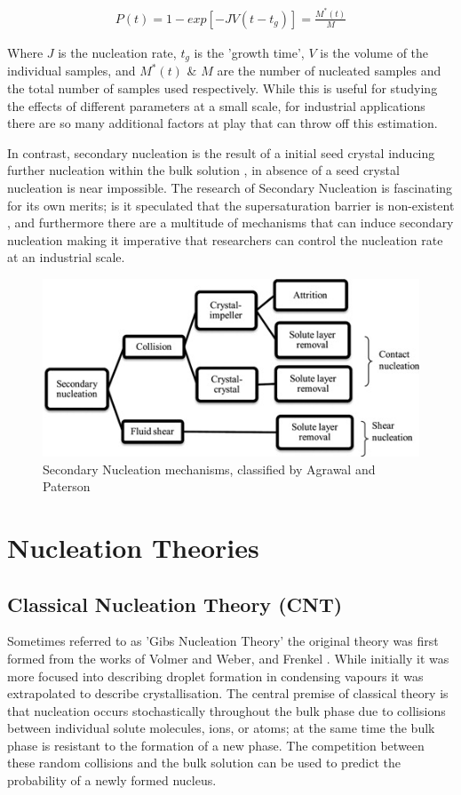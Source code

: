 \begin{align}
	P(t) = 1 - exp\left[-JV(t-t_g)\right] = \frac{M^*(t)}{M}
\end{align}

Where $J$ is the nucleation rate, $t_g$ is the 'growth time', $V$
is the volume of the individual samples, and $M^*(t)$ \& $M$ are the 
number of nucleated samples and the total number of samples used respectively.
While this is useful for studying the effects of different parameters
at a small scale, for industrial applications there are so many
additional factors at play that can throw off this estimation.

In contrast, secondary nucleation is the result of a initial 
seed crystal inducing further nucleation within the bulk solution
\cite{Botsaris1976}, in absence of a seed crystal nucleation is
near impossible. The research of Secondary Nucleation is fascinating
for its own merits; is it speculated that the supersaturation 
barrier is non-existent \cite{Cashmore2022}, and furthermore there 
are a multitude of mechanisms that can induce secondary 
nucleation making it imperative that researchers can control the
nucleation rate at an industrial scale. 

\begin{figure}[h!]
	\includegraphics[width=\linewidth]{secondary_nucleation.jpg}
	\caption{Secondary Nucleation mechanisms, classified by Agrawal and Paterson \cite{Agrawal2015}}
\end{figure}

\section{Nucleation Theories}
\subsection{Classical Nucleation Theory (CNT)}
Sometimes referred to as 'Gibs Nucleation Theory' the 
original theory was first formed from the works of Volmer 
and Weber, and Frenkel \cite{Frenkel1939, Volmer1926}. 
While initially it was more focused into describing droplet 
formation in condensing vapours it was extrapolated to describe
crystallisation. The central premise of classical theory 
is that nucleation occurs stochastically throughout the bulk
phase due to collisions between individual solute molecules,
ions, or atoms; at the same time the bulk phase is resistant
to the formation of a new phase. The competition between
these random collisions and the bulk solution can be used to 
predict the probability of a newly formed nucleus.
 
